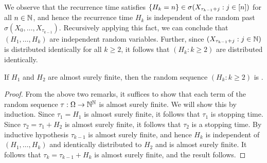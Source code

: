 \documentclass[letterpaper,10pt,english]{article}
\begin{document}
\begin{rem}
We observe that the recurrence time satisfies $\left\{H_k = n\right\} \in \sigma(X_{\tau_{k-1}+j}: j \in [n])$ for all $n \in \mathbb{N}$, 
and hence the recurrence time $H_k$ is independent of the random past $\sigma(X_0, \dots, X_{\tau_{k-1}})$. 
Recursively applying this fact, we can conclude that $(H_1, \dots, H_k)$ are independent random variables. 
Further, since $(X_{\tau_{k-1}+j}: j \in \mathbb{N})$ is distributed identically for all $k \ge 2$, it follows that $(H_k: k \ge 2)$ are distributed identically.
\end{rem}
\begin{lem}
If $H_1$ and $H_2$ are almost surely finite, 
then the random sequence $(H_k: k \ge 2)$ is \iid.
\end{lem}
\begin{proof} 
From the above two remarks, it suffices to show that each term of the random sequence $\tau:\Omega\to\mathbb{N}^{\mathbb{N}}$ is almost surely finite. 
We will show this by induction. 
Since $\tau_1 = H_1$ is almost surely finite, it follows that $\tau_1$ is stopping time. 
Since $\tau_2 = \tau_1+ H_2$ is almost surely finite,  it follows that $\tau_2$ is a stopping time. 
By inductive hypothesis $\tau_{k-1}$ is almost surely finite, 
and hence $H_k$ is independent of $(H_1, \dots, H_k)$ and identically distributed to $H_2$ and is almost surely finite. 
It follows that $\tau_k = \tau_{k-1} + H_k$ is almost surely finite, 
and the result follows. %
\end{proof}
\end{document}
